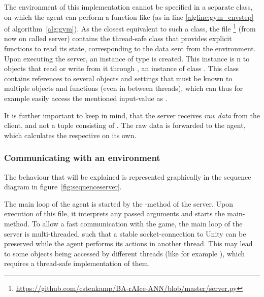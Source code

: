 The environment of this implementation cannot be specified in a separate class, on which the agent can perform a function like  (as in line \ref{algline:gym_envstep} of algorithm~\ref{alg:gym}). As the closest equivalent to such a class, the file  \footnote{\url{https://github.com/cstenkamp/BA-rAIce-ANN/blob/master/server.py}} (from now on called server) contains the thread-safe class  that provides explicit functions to read its state, corresponding to the data sent from the environment. Upon executing the server, an instance  of type  is created. This instance is n to objects that read or write from it through , an instance of class . This class contains references to several objects and settings that must be known to multiple objects and functions (even in between threads), which can thus for example easily access the mentioned input-value as .

It is further important to keep in mind, that the server receives \textit{raw data} from the client, and not a tuple consisting of . The raw data is forwarded to the agent, which calculates the respective  on its own. 

\subsubsection{Communicating with an environment}

The behaviour that will be explained is represented graphically in the sequence diagram in figure~\ref{fig:sequenceserver}. 

The main loop of the agent is started by the -method of the server. Upon execution of this file, it interprets any passed arguments and starts the main-method. %
To allow a fast communication with the game, the main loop of the server is multi-threaded, such that a stable socket-connection to Unity can be preserved while the agent performs its actions in another thread. This may lead to some objects being accessed by different threads (like for example ), which requires a thread-safe implementation of them.

